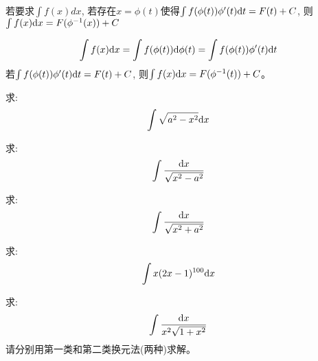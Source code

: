 \begin{theorem}[第二类换元积分法]
    若要求$\int f(x) dx$, 若存在$x = \phi(t)$使得$\int f(\phi(t))\phi'(t) \mathrm{d} t = F(t) + C$, 则$\int f(x) \mathrm{d} x = F(\phi^{-1}(x)) + C$
\end{theorem}
\begin{remark}
    \begin{equation*}
        \int f(x) \mathrm{d} x = \int f(\phi(t)) \mathrm{d} \phi(t) = \int f(\phi(t)) \phi'(t) \mathrm{d} t
    \end{equation*}
    若$\int f(\phi(t)) \phi'(t) \mathrm{d} t = F(t) + C$, 则$\int f(x) \mathrm{d} x = F(\phi^{-1}(t)) + C$。
\end{remark}
\begin{example}
    求:
    \begin{equation*}
        \int \sqrt{a^2-x^2} \mathrm{d} x
    \end{equation*}
\end{example}
\begin{solution}
    
\end{solution}

\begin{example}
    求:
    \begin{equation*}
        \int \frac{\mathrm{d} x}{\sqrt{x^2-a^2}}
    \end{equation*}
\end{example}
\begin{solution}
    
\end{solution}

\begin{example}
    求:
    \begin{equation}
        \int \frac{\mathrm{d} x}{\sqrt{x^2+a^2}}
    \end{equation}
\end{example}
\begin{solution}
    
\end{solution}

\begin{example}
    求:
    \begin{equation*}
        \int x(2x-1)^{100} \mathrm{d} x
    \end{equation*}
\end{example}
\begin{solution}
    
\end{solution}

\begin{example}
    求:
    \begin{equation*}
        \int \frac{\mathrm{d} x}{x^2\sqrt{1+x^2}}
    \end{equation*}
    请分别用第一类和第二类换元法(两种)求解。
\end{example}
\begin{solution}
    
\end{solution}